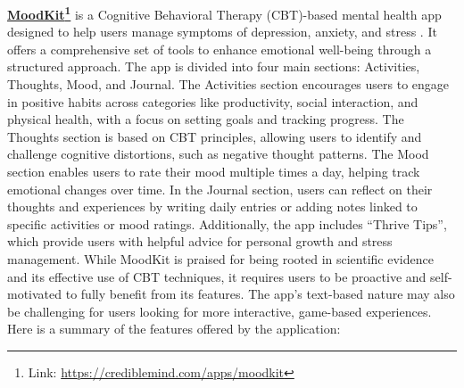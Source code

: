 \textbf{\href{https://crediblemind.com/apps/moodkit}{MoodKit}\footnote{Link: \url{https://crediblemind.com/apps/moodkit}}} is a Cognitive Behavioral Therapy (CBT)-based mental health app designed to help users manage symptoms of depression, anxiety, and stress \cite{moodkit-review}. It offers a comprehensive set of tools to enhance emotional well-being through a structured approach. The app is divided into four main sections: Activities, Thoughts, Mood, and Journal. The Activities section encourages users to engage in positive habits across categories like productivity, social interaction, and physical health, with a focus on setting goals and tracking progress. The Thoughts section is based on CBT principles, allowing users to identify and challenge cognitive distortions, such as negative thought patterns. The Mood section enables users to rate their mood multiple times a day, helping track emotional changes over time. In the Journal section, users can reflect on their thoughts and experiences by writing daily entries or adding notes linked to specific activities or mood ratings. Additionally, the app includes ``Thrive Tips'', which provide users with helpful advice for personal growth and stress management. While MoodKit is praised for being rooted in scientific evidence and its effective use of CBT techniques, it requires users to be proactive and self-motivated to fully benefit from its features. The app's text-based nature may also be challenging for users looking for more interactive, game-based experiences.\vspace{5mm} \\
Here is a summary of the features offered by the application:\vspace{5mm}

